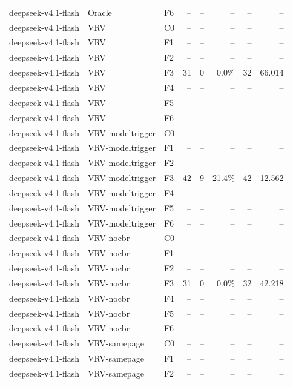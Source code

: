 \begin{tabular}{lllrrrrr}
deepseek-v4.1-flash & Oracle & F6 & -- & -- & -- & -- & -- \\
deepseek-v4.1-flash & VRV & C0 & -- & -- & -- & -- & -- \\
deepseek-v4.1-flash & VRV & F1 & -- & -- & -- & -- & -- \\
deepseek-v4.1-flash & VRV & F2 & -- & -- & -- & -- & -- \\
deepseek-v4.1-flash & VRV & F3 & 31 & 0 & 0.0\% & 32 & 66.014 \\
deepseek-v4.1-flash & VRV & F4 & -- & -- & -- & -- & -- \\
deepseek-v4.1-flash & VRV & F5 & -- & -- & -- & -- & -- \\
deepseek-v4.1-flash & VRV & F6 & -- & -- & -- & -- & -- \\
deepseek-v4.1-flash & VRV-modeltrigger & C0 & -- & -- & -- & -- & -- \\
deepseek-v4.1-flash & VRV-modeltrigger & F1 & -- & -- & -- & -- & -- \\
deepseek-v4.1-flash & VRV-modeltrigger & F2 & -- & -- & -- & -- & -- \\
deepseek-v4.1-flash & VRV-modeltrigger & F3 & 42 & 9 & 21.4\% & 42 & 12.562 \\
deepseek-v4.1-flash & VRV-modeltrigger & F4 & -- & -- & -- & -- & -- \\
deepseek-v4.1-flash & VRV-modeltrigger & F5 & -- & -- & -- & -- & -- \\
deepseek-v4.1-flash & VRV-modeltrigger & F6 & -- & -- & -- & -- & -- \\
deepseek-v4.1-flash & VRV-nocbr & C0 & -- & -- & -- & -- & -- \\
deepseek-v4.1-flash & VRV-nocbr & F1 & -- & -- & -- & -- & -- \\
deepseek-v4.1-flash & VRV-nocbr & F2 & -- & -- & -- & -- & -- \\
deepseek-v4.1-flash & VRV-nocbr & F3 & 31 & 0 & 0.0\% & 32 & 42.218 \\
deepseek-v4.1-flash & VRV-nocbr & F4 & -- & -- & -- & -- & -- \\
deepseek-v4.1-flash & VRV-nocbr & F5 & -- & -- & -- & -- & -- \\
deepseek-v4.1-flash & VRV-nocbr & F6 & -- & -- & -- & -- & -- \\
deepseek-v4.1-flash & VRV-samepage & C0 & -- & -- & -- & -- & -- \\
deepseek-v4.1-flash & VRV-samepage & F1 & -- & -- & -- & -- & -- \\
deepseek-v4.1-flash & VRV-samepage & F2 & -- & -- & -- & -- & -- \\

\end{tabular}
